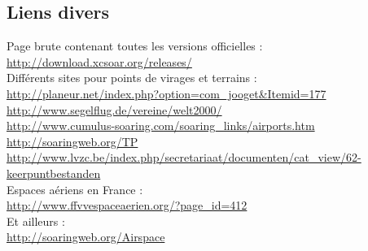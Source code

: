 \documentclass{article}
\begin{document}
\subsection{Liens divers}
\noindent
\label{LiensDivers}
\begin{flushleft}
Page brute contenant toutes les versions officielles :\\ \url{http://download.xcsoar.org/releases/}\\
Différents sites pour points de virages et terrains :\\
\url{http://planeur.net/index.php?option=com_jooget&Itemid=177}\\
\url{http://www.segelflug.de/vereine/welt2000/}\\
\url{http://www.cumulus-soaring.com/soaring_links/airports.htm}\\
\url{http://soaringweb.org/TP}\\
\url{http://www.lvzc.be/index.php/secretariaat/documenten/cat_view/62-keerpuntbestanden}\\
Espaces aériens en France :\\
\url{http://www.ffvvespaceaerien.org/?page_id=412}\\
Et ailleurs :\\
\url{http://soaringweb.org/Airspace}\\
\end{flushleft}
%
\end{document}
